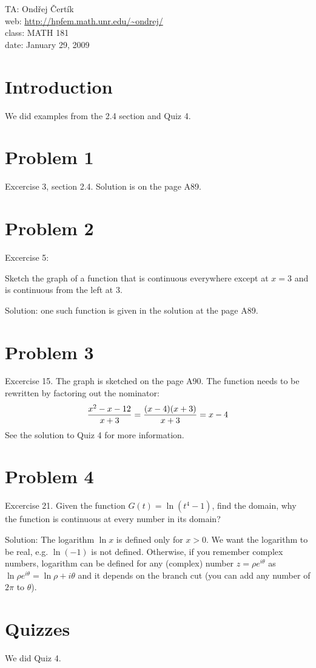 \documentclass[10pt]{article}
\begin{document}
\noindent TA: Ondřej Čertík\\
web: \url{http://hpfem.math.unr.edu/~ondrej/}\\
class: MATH 181\\
date: January 29, 2009

\section{Introduction}

We did examples from the 2.4 section and Quiz 4.

\section{Problem 1}

Excercise 3, section 2.4. Solution is on the page A89.

\section{Problem 2}

Excercise 5:

Sketch the graph of a function that is continuous everywhere except at $x=3$
and is continuous from the left at 3.

Solution: one such function is given in the solution at the page A89.

\section{Problem 3}

Excercise 15. The graph is sketched on the page A90. The function needs to be
rewritten by factoring out the nominator:
$${x^2-x-12\over x+3} = {(x-4)(x+3)\over x+3} = x-4$$
See the solution to Quiz 4 for more information.

\section{Problem 4}

Excercise 21. Given the function $G(t) = \ln(t^4-1)$, find the domain, why the
function is continuous at every number in its domain?

Solution: The logarithm $\ln x$ is defined only for $x>0$. We want the
logarithm to be real, e.g. $\ln(-1)$ is not defined. Otherwise, if you remember
complex numbers, logarithm can be defined for any (complex) number $z=\rho
e^{i\theta}$ as $\ln \rho e^{i\theta} = \ln\rho+i\theta$ and it depends on the
branch cut (you can add any number of $2\pi$ to $\theta$).

\section{Quizzes}

We did Quiz 4.
\end{document}
